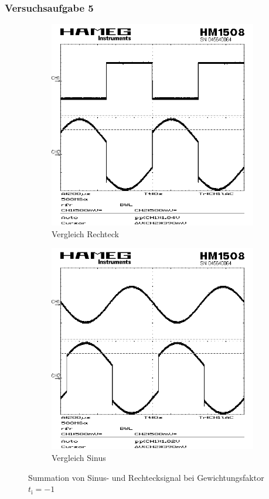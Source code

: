 \documentclass[numbers=noenddot,12pt,a4paper]{scrartcl}
\newcommand{\ix}[1]{_\text{#1}}
\begin{document}
\subsubsection{Versuchsaufgabe 5}
\begin{figure}[H]
\centering
\begin{subfigure}[b]{0.48\textwidth}
\includegraphics[width=\textwidth]{rechteck.png}
\caption{Vergleich Rechteck} 
\label{img:rechteck}
\end{subfigure}
\begin{subfigure}[b]{0.48\textwidth}
\includegraphics[width=\textwidth]{sinus.png}
\caption{Vergleich Sinus}
\label{img:sinus}
\end{subfigure}
\caption{Summation von Sinus- und Rechtecksignal bei Gewichtungsfaktor $t\ix{i}=-1$} \label{img:Summation}
\end{figure}
\end{document}
